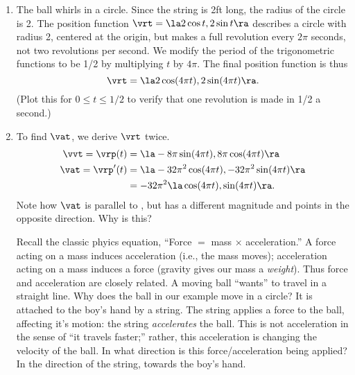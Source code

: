 {\begin{enumerate}
	\item The ball whirls in a  circle. Since the string is 2ft long, the radius of the circle is 2. The position function $\vrt = \la 2\cos t, 2\sin t\ra$ describes a circle with radius 2, centered at the origin, but makes a full revolution every $2\pi$ seconds, not two revolutions per second. We modify the period of the trigonometric functions to be 1/2 by multiplying $t$ by $4\pi$. The final position function is thus $$\vrt = \la 2\cos (4\pi t), 2\sin (4\pi t)\ra.$$
	(Plot this for $0\leq t\leq 1/2$ to verify that one revolution is made in 1/2 a second.)
	
	\item		To find $\vat$, we derive $\vrt$ twice.
	\begin{align*}
	\vvt = \vrp(t) &= \la -8\pi \sin (4\pi t), 8\pi \cos (4\pi t)\ra\\
	\vat =\vrp'(t) &= \la -32\pi^2 \cos (4\pi t), -32\pi^2 \sin (4\pi t) \ra \\
				&= -32\pi^2\la \cos (4\pi t), \sin (4\pi t)\ra.
	\end{align*}
	Note how $\vat$ is parallel to \vrt, but has a different magnitude and points in the opposite direction. Why is this?
	
	Recall the classic phyics equation, ``Force $=$ mass $\times$ acceleration.'' A force acting on a mass induces acceleration (i.e., the mass moves); acceleration acting on a mass induces a force (gravity gives our mass a \emph{weight}). Thus force and acceleration are closely related. A moving ball ``wants'' to travel in a straight line. Why does the ball in our example move in a circle? It is attached to the boy's hand by a string. The string applies a force to the ball, affecting it's motion: the string \emph{accelerates} the ball. This is not acceleration in the sense of ``it travels faster;'' rather, this acceleration is changing the velocity of the ball. In what direction is this force/acceleration being applied? In the direction of the string, towards the boy's hand.
	

\end{enumerate}}
